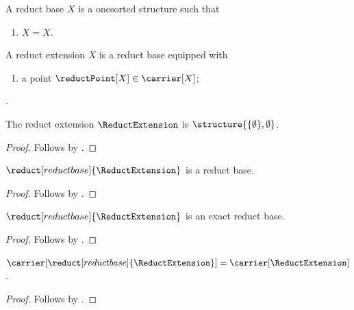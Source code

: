 \begin{struct}\label{reduct_base}
    A reduct base $X$ is a onesorted structure such that
    \begin{enumerate}
        \item\label{reduct_base_reflexive} $X=X$.
    \end{enumerate}
\end{struct}

\begin{struct}\label{reduct_extension}
    A reduct extension $X$ is a reduct base equipped with
    \begin{enumerate}
        \item\label{reduct_extension_point}
            a point $\reductPoint[X]\in\carrier[X]$;
    \end{enumerate}
    .
\end{struct}

\begin{instance}\label{reduct_extension_object}
    The reduct extension $\ReductExtension$ is
    $\structure{\{\emptyset\},\emptyset}$.
\end{instance}
\begin{proof}
    Follows by
    .
\end{proof}

\begin{proposition}\label{reduct_is_parent}
    $\reduct[reduct base]{\ReductExtension}$ is a reduct base.
\end{proposition}
\begin{proof}
    Follows by .
\end{proof}

\begin{proposition}\label{reduct_is_exact_parent}
    $\reduct[reduct base]{\ReductExtension}$ is an exact reduct base.
\end{proposition}
\begin{proof}
    Follows by .
\end{proof}

\begin{proposition}\label{reduct_preserves_carrier}
    $\carrier[\reduct[reduct base]{\ReductExtension}]
        =\carrier[\ReductExtension]$.
\end{proposition}
\begin{proof}
    Follows by .
\end{proof}

